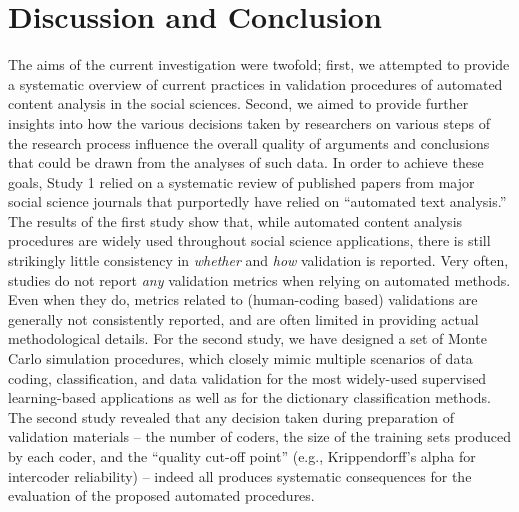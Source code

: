\documentclass[man, 12pt, a4paper, nolmodern, noextraspace]{apa6}
\begin{document}
\section{Discussion and Conclusion}
    
    The aims of the current investigation were twofold; first, we attempted to provide a systematic overview of current practices in validation procedures of automated content analysis in the social sciences. Second, we aimed to provide further insights into how the various decisions taken by researchers on various steps of the research process influence the overall quality of arguments and conclusions that could be drawn from the analyses of such data. In order to achieve these goals, Study 1 relied on a systematic review of published papers from major social science journals that purportedly have relied on \enquote{automated text analysis.} The results of the first study show that, while automated content analysis procedures are widely used throughout social science applications, there is still strikingly little consistency in \textit{whether} and \textit{how} validation is reported. Very often, studies do not report \textit{any} validation metrics when relying on automated methods. Even when they do, metrics related to (human-coding based) validations are generally not consistently reported, and are often limited in providing actual methodological details. For the second study, we have designed a set of Monte Carlo simulation procedures, which closely mimic multiple scenarios of data coding, classification, and data validation for the most widely-used supervised learning-based applications as well as for the dictionary classification methods. The second study revealed that any decision taken during preparation of validation materials -- the number of coders, the size of the training sets produced by each coder, and the \enquote{quality cut-off point} (e.g., Krippendorff's alpha for intercoder reliability) -- indeed all produces systematic consequences for the evaluation of the proposed automated procedures. 
\end{document}
